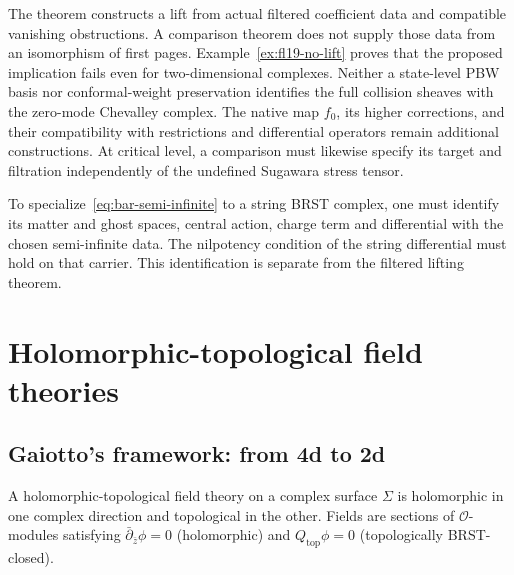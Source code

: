 \begin{remark}
\label{rem:bar-semi-infinite-scope}
The theorem constructs a lift from actual filtered coefficient data and compatible vanishing obstructions.
A comparison theorem does not supply those data from an isomorphism of first pages.
Example~\ref{ex:fl19-no-lift} proves that the proposed implication fails even for two-dimensional complexes.
Neither a state-level PBW basis nor conformal-weight preservation identifies the full collision sheaves with the zero-mode Chevalley complex.
The native map $f_0$, its higher corrections, and their compatibility with restrictions and differential operators remain additional constructions.
At critical level, a comparison must likewise specify its target and filtration independently of the undefined Sugawara stress tensor.
\end{remark}

\begin{remark}
\label{rem:string-brst-special-case}
To specialize~\eqref{eq:bar-semi-infinite} to a string BRST complex, one must identify its matter and ghost spaces, central action, charge term and differential with the chosen semi-infinite data.
The nilpotency condition of the string differential must hold on that carrier.
This identification is separate from the filtered lifting theorem.
\end{remark}



\section{Holomorphic-topological field theories}

\subsection{Gaiotto's framework: from 4d to 2d}

\begin{definition}
A holomorphic-topological field theory on a complex surface $\Sigma$ is holomorphic in one complex direction and topological in the other.  Fields are sections of $\mathcal{O}$-modules satisfying $\bar{\partial}_{\bar{z}} \phi = 0$ (holomorphic) and $Q_{\text{top}} \phi = 0$ (topologically BRST-closed).
\end{definition}


